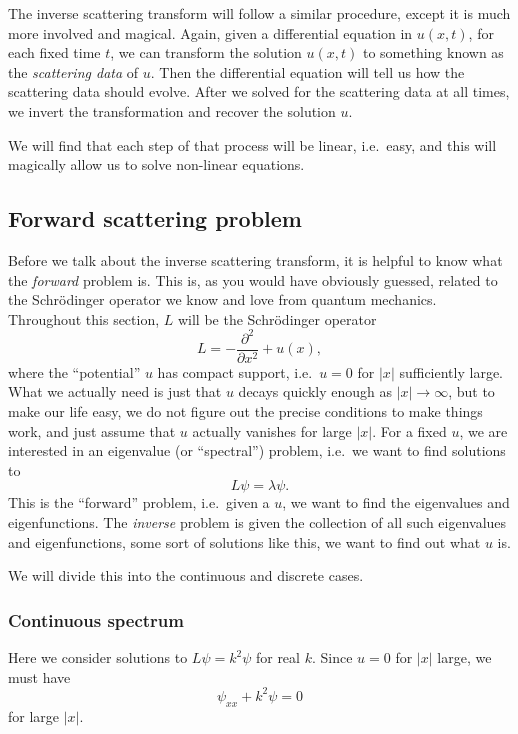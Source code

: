 \documentclass[a4paper]{article}
\begin{document}
The inverse scattering transform will follow a similar procedure, except it is much more involved and magical. Again, given a differential equation in $u(x, t)$, for each fixed time $t$, we can transform the solution $u(x, t)$ to something known as the \emph{scattering data} of $u$. Then the differential equation will tell us how the scattering data should evolve. After we solved for the scattering data at all times, we invert the transformation and recover the solution $u$.

We will find that each step of that process will be linear, i.e.\ easy, and this will magically allow us to solve non-linear equations.
\subsection{Forward scattering problem}
Before we talk about the inverse scattering transform, it is helpful to know what the \emph{forward} problem is. This is, as you would have obviously guessed, related to the Schr\"odinger operator we know and love from quantum mechanics. Throughout this section, $L$ will be the Schr\"odinger operator
\[
  L = -\frac{\partial^2}{\partial x^2} + u(x),
\]
where the ``potential'' $u$ has compact support, i.e.\ $u = 0$ for $|x|$ sufficiently large. What we actually need is just that $u$ decays quickly enough as $|x| \to \infty$, but to make our life easy, we do not figure out the precise conditions to make things work, and just assume that $u$ actually vanishes for large $|x|$. For a fixed $u$, we are interested in an eigenvalue (or ``spectral'') problem, i.e.\ we want to find solutions to
\[
  L \psi = \lambda \psi.
\]
This is the ``forward'' problem, i.e.\ given a $u$, we want to find the eigenvalues and eigenfunctions. The \emph{inverse} problem is given the collection of all such eigenvalues and eigenfunctions, some sort of solutions like this, we want to find out what $u$ is.

We will divide this into the continuous and discrete cases.
\subsubsection{Continuous spectrum}\label{sssec:continuous-spectrum}
Here we consider solutions to $L\psi = k^2 \psi$ for real $k$. Since $u = 0$ for $|x|$ large, we must have
\[
  \psi_{xx} + k^2 \psi = 0
\]
for large $|x|$.
\end{document}
